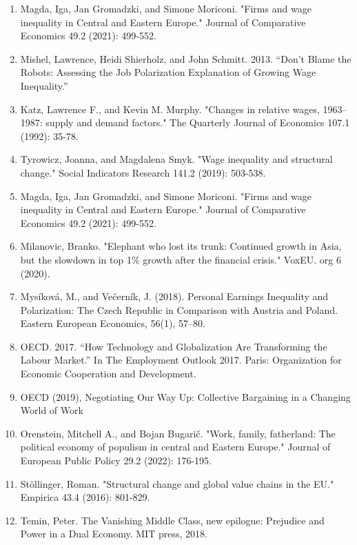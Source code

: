 \documentclass{article}
\begin{document}
\begin{enumerate}
\item Magda, Iga, Jan Gromadzki, and Simone Moriconi. "Firms and wage inequality in Central and Eastern Europe." Journal of Comparative Economics 49.2 (2021): 499-552.

\item Mishel, Lawrence, Heidi Shierholz, and John Schmitt. 2013. “Don’t Blame the Robots: Assessing the Job Polarization Explanation of Growing Wage Inequality.”

\item Katz, Lawrence F., and Kevin M. Murphy. "Changes in relative wages, 1963–1987: supply and demand factors." The Quarterly Journal of Economics 107.1 (1992): 35-78.

\item Tyrowicz, Joanna, and Magdalena Smyk. "Wage inequality and structural change." Social Indicators Research 141.2 (2019): 503-538.

\item Magda, Iga, Jan Gromadzki, and Simone Moriconi. "Firms and wage inequality in Central and Eastern Europe." Journal of Comparative Economics 49.2 (2021): 499-552.

\item Milanovic, Branko. "Elephant who lost its trunk: Continued growth in Asia, but the slowdown in top 1\% growth after the financial crisis." VoxEU. org 6 (2020).

\item Mysíková, M., and Večerník, J. (2018). Personal Earnings Inequality and Polarization: The Czech Republic in Comparison with Austria and Poland. Eastern European Economics, 56(1), 57–80.

\item OECD. 2017. “How Technology and Globalization Are Transforming the Labour Market.” In The Employment Outlook 2017. Paris: Organization for Economic Cooperation and Development.

\item OECD (2019), Negotiating Our Way Up: Collective Bargaining in a Changing World of Work

\item Orenstein, Mitchell A., and Bojan Bugarič. "Work, family, fatherland: The political economy of populism in central and Eastern Europe." Journal of European Public Policy 29.2 (2022): 176-195.

\item Stöllinger, Roman. "Structural change and global value chains in the EU." Empirica 43.4 (2016): 801-829.

\item Temin, Peter. The Vanishing Middle Class, new epilogue: Prejudice and Power in a Dual Economy. MIT press, 2018.













\end{enumerate}
\end{document}
